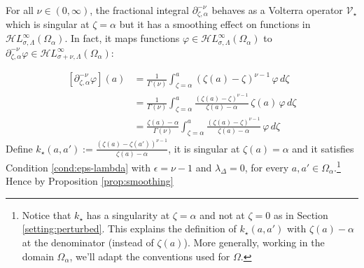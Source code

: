 \documentclass{article}
\theoremstyle{plain}
\newcommand{\R}{\mathbb{R}}
\newcommand{\fracderiv}[3]{\partial^{#1}_{#2, #3}}
\newcommand{\singexp}[2]{\mathcal{H}L^\infty_{#1, #2}}
\newcommand{\softpart}{\mathcal{V}_\star}
\newcommand{\softker}{k_\star}
\newcommand{\domain}{\Omega}
\begin{document}

For all $\nu\in (0,\infty)$, the fractional integral $\fracderiv{-\nu}{\zeta}{\alpha}$ behaves as a Volterra operator $\softpart$ which is singular at $\zeta=\alpha$ but it has a smoothing effect on functions in $\singexp{\sigma}{\Lambda}(\domain_\alpha)$. In fact, it maps functions $\varphi\in\singexp{\sigma}{\Lambda}(\domain_\alpha)$ to $\fracderiv{-\nu}{\zeta}{\alpha}\varphi\in\singexp{\sigma+\nu}{\Lambda}(\domain_\alpha)$: %

\begin{align*}
    \left[\fracderiv{-\nu}{\zeta}{\alpha} \varphi\right](a)&=\frac{1}{\Gamma(\nu)}\int_{\zeta=\alpha}^a (\zeta(a)-\zeta)^{\nu-1} \, \varphi \, d\zeta\\
    &=\frac{1}{\Gamma(\nu)}\int_{\zeta=\alpha}^a \frac{(\zeta(a)-\zeta)^{\nu-1}}{\zeta(a)- \alpha}\,  \zeta(a)\, \varphi \, d\zeta\\
    &=\frac{\zeta(a)-\alpha}{\Gamma(\nu)}\int_{\zeta=\alpha}^a \frac{(\zeta(a)-\zeta)^{\nu-1}}{\zeta(a)- \alpha}\, \varphi \, d\zeta
\end{align*}
Define $\softker(a,a'):=\frac{(\zeta(a)-\zeta(a'))^{\nu-1}}{\zeta(a) - \alpha}$, it is singular at $\zeta(a)=\alpha$ and it satisfies Condition \eqref{cond:eps-lambda} with $\epsilon=\nu-1$ and $\lambda_\Delta=0$, for every $a,a'\in\domain_\alpha$.\footnote{Notice that $\softker$ has a singularity at $\zeta=\alpha$ and not at $\zeta=0$ as in Section \ref{setting:perturbed}. This explains the definition of $\softker(a,a')$ with $\zeta(a)-\alpha$ at the denominator (instead of $\zeta(a)$). More generally, working in the domain $\domain_\alpha$, we'll adapt the conventions used for $\domain$.} Hence by Proposition \ref{prop:smoothing}
\end{document}
